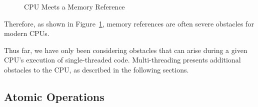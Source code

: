 \begin{figure}[htb]
\begin{center}
\end{center}
\caption{CPU Meets a Memory Reference}
\label{fig:cpu:CPU Meets a Memory Reference}
\end{figure}

Therefore, as shown in
Figure~\ref{fig:cpu:CPU Meets a Memory Reference},
memory references are often severe obstacles for modern CPUs.

Thus far, we have only been considering obstacles that can arise during
a given CPU's execution of single-threaded code.
Multi-threading presents additional obstacles to the CPU, as
described in the following sections.

\subsection{Atomic Operations}
\label{sec:cpu:Atomic Operations}

